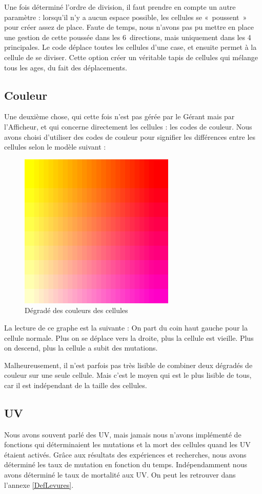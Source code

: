   Une fois déterminé l'ordre de division, il faut prendre en compte un autre paramètre : lorsqu'il n'y a aucun espace possible, les cellules se «~poussent~» pour créer assez de place. Faute de temps, nous n'avons pas pu mettre en place une gestion de cette poussée dans les 6 directions, mais uniquement dans les 4 principales. Le code déplace toutes les cellules d'une case, et ensuite permet à la cellule de se diviser. Cette option créer un véritable tapis de cellules qui mélange tous les ages, du fait des déplacements. \\

\subsection{Couleur}
  Une deuxième chose, qui cette fois n'est pas gérée par le Gérant mais par l'Afficheur, et qui concerne directement les cellules : les codes de couleur. Nous avons choisi d'utiliser des codes de couleur pour signifier les différences entre les cellules selon le modèle suivant : 
    \begin{figure}[H]
      \centering
      \includegraphics[width=20em]{Images/test.png}
      \caption{Dégradé des couleurs des cellules}
    \end{figure}
    
  La lecture de ce graphe est la suivante : On part du coin haut gauche pour la cellule normale. Plus on se déplace vers la droite, plus la cellule est vieille. Plus on descend, plus la cellule a subit des mutations.
  
  Malheureusement, il n'est parfois pas très lisible de combiner deux dégradés de couleur sur une seule cellule. Mais c'est le moyen qui est le plus lisible de tous, car il est indépendant de la taille des cellules.
  
\subsection{UV}
  Nous avons souvent parlé des UV, mais jamais nous n'avons implémenté de fonctions qui déterminaient les mutations et la mort des cellules quand les UV étaient activés. Grâce aux résultats des expériences et recherches, nous avons déterminé les taux de mutation en fonction du temps. Indépendamment nous avons déterminé le taux de mortalité aux UV. On peut les retrouver dans l'annexe \ref{DefLevures}.
  
